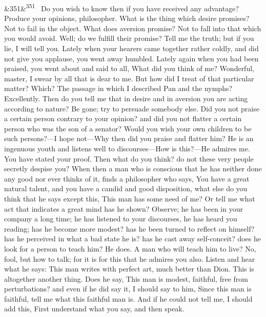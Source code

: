 \documentclass[12pt]{article}
\newcommand{\para}[1][]{\par\noindent\ifx&#1&\else\textsuperscript{\footnotesize #1}~\fi}
\begin{document}
\para[351] Do you wish to know then if you have received any advantage? Produce your opinions, philosopher. What is the thing which desire promises? Not to fail in the object. What does aversion promise? Not to fall into that which you would avoid. Well; do we fulfill their promise? Tell me the truth; but if you lie, I will tell you. Lately when your hearers came together rather coldly, and did not give you applause, you went away humbled. Lately again when you had been praised, you went about and said to all, What did you think of me? Wonderful, master, I swear by all that is dear to me. But how did I treat of that particular matter? Which? The passage in which I described Pan and the nymphs? Excellently. Then do you tell me that in desire and in aversion you are acting according to nature? Be gone; try to persuade somebody else. Did you not praise a certain person contrary to your opinion? and did you not flatter a certain person who was the son of a senator? Would you wish your own children to be such persons?—I hope not—Why then did you praise and flatter him? He is an ingenuous youth and listens well to discourses—How is this?—He admires me. You have stated your proof. Then what do you think? do not these very people secretly despise you? When then a man who is conscious that he has neither done any good nor ever thinks of it, finds a philosopher who says, You have a great natural talent, and you have a candid and good disposition, what else do you think that he says except this, This man has some need of me? Or tell me what act that indicates a great mind has he shown? Observe; he has been in your company a long time; he has listened to your discourses, he has heard you reading; has he become more modest? has he been turned to reflect on himself? has he perceived in what a bad state he is? has he cast away self-conceit? does he look for a person to teach him? He does. A man who will teach him to live? No, fool, but how to talk; for it is for this that he admires you also. Listen and hear what he says: This man writes with perfect art, much better than Dion. This is altogether another thing. Does he say, This man is modest, faithful, free from perturbations? and even if he did say it, I should say to him, Since this man is faithful, tell me what this faithful man is. And if he could not tell me, I should add this, First understand what you say, and then speak.
\end{document}
